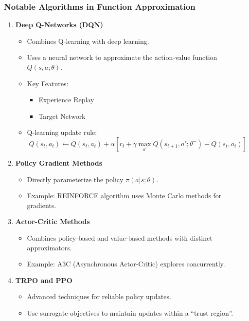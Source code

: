 \documentclass[aspectratio=169]{beamer}
\begin{document}
\begin{frame}[fragile]
  \frametitle{Notable Algorithms in Function Approximation}
  \begin{enumerate}
    \item \textbf{Deep Q-Networks (DQN)}
      \begin{itemize}
        \item Combines Q-learning with deep learning.
        \item Uses a neural network to approximate the action-value function \( Q(s, a; \theta) \).
        \item Key Features:
          \begin{itemize}
            \item Experience Replay
            \item Target Network
          \end{itemize}
        \item Q-learning update rule:
        \begin{equation}
          Q(s_t, a_t) \leftarrow Q(s_t, a_t) + \alpha \left[ r_t + \gamma \max_{a'}Q(s_{t+1}, a'; \theta^-) - Q(s_t, a_t) \right]
        \end{equation}
      \end{itemize}

    \item \textbf{Policy Gradient Methods}
      \begin{itemize}
        \item Directly parameterize the policy \( \pi(a|s; \theta) \).
        \item Example: REINFORCE algorithm uses Monte Carlo methods for gradients.
      \end{itemize}
    
    \item \textbf{Actor-Critic Methods}
      \begin{itemize}
        \item Combines policy-based and value-based methods with distinct approximators.
        \item Example: A3C (Asynchronous Actor-Critic) explores concurrently.
      \end{itemize}

    \item \textbf{TRPO and PPO}
      \begin{itemize}
        \item Advanced techniques for reliable policy updates.
        \item Use surrogate objectives to maintain updates within a “trust region”.
      \end{itemize}
  \end{enumerate}
\end{frame}
\end{document}
